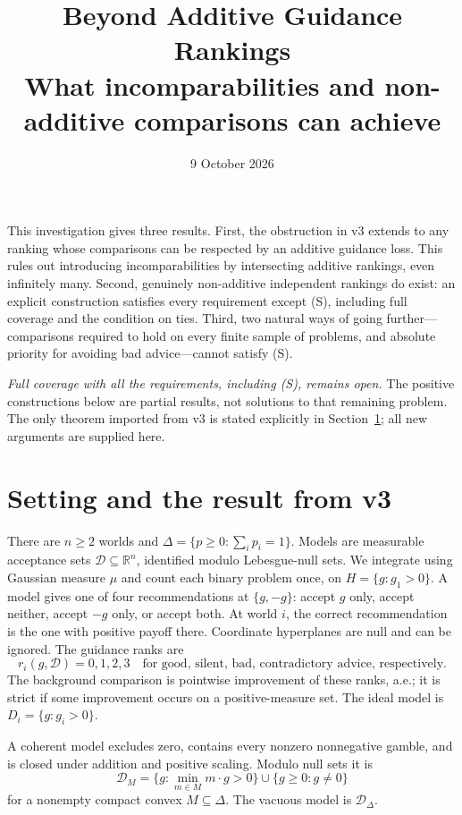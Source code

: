 \documentclass[11pt]{article}
\title{Beyond Additive Guidance Rankings\\[3pt]\large What incomparabilities and non-additive comparisons can achieve}
\author{}\date{9 October 2026}
\theoremstyle{remark}\newtheorem{remark}[theorem]{Remark}
\newcommand{\R}{\mathbb R}
\newcommand{\Dscr}{\mathcal D}
\begin{document}
\maketitle

\noindent
This investigation gives three results. First, the obstruction in v3 extends
to any ranking whose comparisons can be respected by an additive guidance
loss. This rules out introducing incomparabilities by intersecting additive
rankings, even infinitely many. Second, genuinely non-additive independent
rankings do exist: an explicit construction satisfies every requirement
except (S), including full coverage and the condition on ties. Third, two
natural ways of going further---comparisons required to hold on every finite
sample of problems, and absolute priority for avoiding bad advice---cannot
satisfy (S).

\emph{Full coverage with all the requirements, including (S), remains open.}
The positive constructions below are partial results, not solutions to that
remaining problem. The only theorem imported from v3 is stated explicitly
in Section~\ref{sec:setup}; all new arguments are supplied here.

\section{Setting and the result from v3}\label{sec:setup}

There are $n\ge2$ worlds and $\Delta=\{p\ge0:\sum_i p_i=1\}$.
Models are measurable acceptance sets $\Dscr\subseteq\R^n$, identified modulo
Lebesgue-null sets. We integrate using Gaussian measure $\mu$ and count each
binary problem once, on $H=\{g:g_1>0\}$.
A model gives one of four recommendations at $\{g,-g\}$: accept $g$ only,
accept neither, accept $-g$ only, or accept both. At world $i$, the correct
recommendation is the one with positive payoff there. Coordinate hyperplanes
are null and can be ignored. The guidance ranks are
\[
 r_i(g,\Dscr)=0,1,2,3
 \quad\text{for good, silent, bad, contradictory advice, respectively.}
\]
The background comparison is pointwise improvement of these ranks, a.e.;
it is strict if some improvement occurs on a positive-measure set.
The ideal model is $D_i=\{g:g_i>0\}$.

A coherent model excludes zero, contains every nonzero nonnegative gamble,
and is closed under addition and positive scaling. Modulo null sets it is
\[
 \Dscr_M=\{g:\min_{m\in M}m\cdot g>0\}
       \cup\{g\ge0:g\ne0\}
\]
for a nonempty compact convex $M\subseteq\Delta$.
The vacuous model is $\Dscr_\Delta$.
\end{document}
